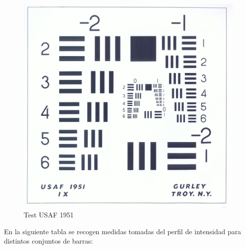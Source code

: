 \documentclass[12pt,a5paper]{article}
\begin{document}
\begin{figure}[h]
    \centering
    \includegraphics[scale=0.05]{testusaf1951}
    \caption{Test USAF 1951}
    \label{fig:usaf1951}
\end{figure}

En la siguiente tabla se recogen medidas tomadas del perfil de intensidad para distintos conjuntos de barras:
\end{document}
